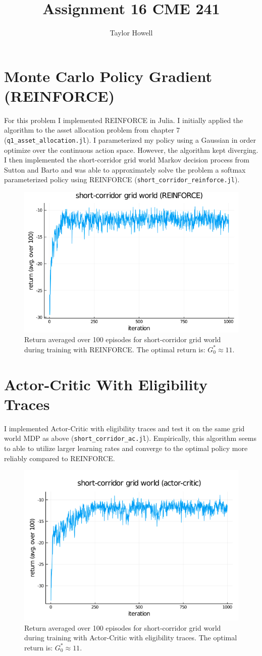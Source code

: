 \documentclass[12pt]{article}
\title{\textbf{Assignment 16 CME 241}}
\author{Taylor Howell}
\begin{document}
\maketitle

\newpage

\section{Monte Carlo Policy Gradient (REINFORCE)}
For this problem I implemented REINFORCE in Julia. I initially applied the algorithm to the asset allocation problem from chapter 7 (\texttt{q1\_asset\_allocation.jl}). I parameterized my policy using a Gaussian in order optimize over the continuous action space. However, the algorithm kept diverging. I then implemented the short-corridor grid world Markov decision process from Sutton and Barto and was able to approximately solve the problem a softmax parameterized policy using REINFORCE (\texttt{short\_corridor\_reinforce.jl}).

\begin{figure}[H]
	\centering
	\includegraphics[width=.75\textwidth]{figures/sc_gw_reinforce.png}
	\caption{Return averaged over 100 episodes for short-corridor grid world during training with REINFORCE. The optimal return is: $G_0^* \approx 11$.}
	\label{}
\end{figure}

\section{Actor-Critic With Eligibility Traces}
I implemented Actor-Critic with eligibility traces and test it on the same grid world MDP as above (\texttt{short\_corridor\_ac.jl}). Empirically, this algorithm seems to able to utilize larger learning rates and converge to the optimal policy more reliably compared to REINFORCE.

\begin{figure}[H]
	\centering
	\includegraphics[width=.75\textwidth]{figures/sc_gw_ac.png}
	\caption{Return averaged over 100 episodes for short-corridor grid world during training with Actor-Critic with eligibility traces. The optimal return is: $G_0^* \approx 11$.}
	\label{}
\end{figure}
\end{document}
